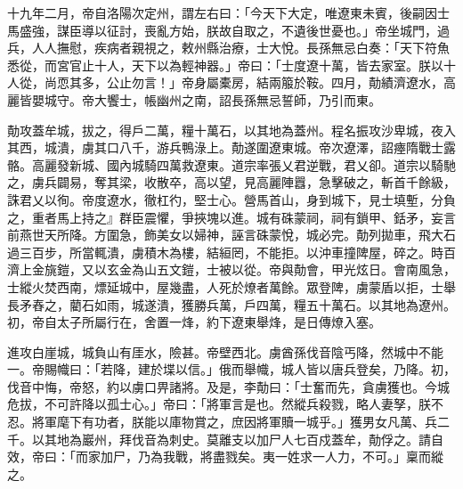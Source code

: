 \begin{pinyinscope}
 十九年二月，帝自洛陽次定州，謂左右曰：「今天下大定，唯遼東未賓，後嗣因士馬盛強，謀臣導以征討，喪亂方始，朕故自取之，不遺後世憂也。」帝坐城門，過兵，人人撫慰，疾病者親視之，敕州縣治療，士大悅。長孫無忌白奏：「天下符魚悉從，而宮官止十人，天下以為輕神器。」帝曰：「士度遼十萬，皆去家室。朕以十人從，尚恧其多，公止勿言！」帝身屬橐房，結兩箙於鞍。四月，勣績濟遼水，高麗皆嬰城守。帝大饗士，帳幽州之南，詔長孫無忌誓師，乃引而東。



 勣攻蓋牟城，拔之，得戶二萬，糧十萬石，以其地為蓋州。程名振攻沙卑城，夜入其西，城潰，虜其口八千，游兵鴨淥上。勣遂圍遼東城。帝次遼澤，詔瘞隋戰士露骼。高麗發新城、國內城騎四萬救遼東。道宗率張乂君逆戰，君乂卻。道宗以騎馳之，虜兵闢易，奪其梁，收散卒，高以望，見高麗陣囂，急擊破之，斬首千餘級，誅君乂以徇。帝度遼水，徹杠彴，堅士心。營馬首山，身到城下，見士填塹，分負之，重者馬上持之』群臣震懼，爭挾塊以進。城有硃蒙祠，祠有鎖甲、銛矛，妄言前燕世天所降。方圍急，飾美女以婦神，誣言硃蒙悅，城必完。勣列拋車，飛大石過三百步，所當輒潰，虜積木為樓，結絙罔，不能拒。以沖車撞陴屋，碎之。時百濟上金旐鎧，又以玄金為山五文鎧，士被以從。帝與勣會，甲光炫日。會南風急，士縱火焚西南，熛延城中，屋幾盡，人死於燎者萬餘。眾登陴，虜蒙盾以拒，士舉長矛舂之，藺石如雨，城遂潰，獲勝兵萬，戶四萬，糧五十萬石。以其地為遼州。初，帝自太子所屬行在，舍置一烽，約下遼東舉烽，是日傳燎入塞。



 進攻白崖城，城負山有厓水，險甚。帝壁西北。虜酋孫伐音陰丐降，然城中不能一。帝賜幟曰：「若降，建於堞以信。」俄而舉幟，城人皆以唐兵登矣，乃降。初，伐音中悔，帝怒，約以虜口畀諸將。及是，李勣曰：「士奮而先，貪虜獲也。今城危拔，不可許降以孤士心。」帝曰：「將軍言是也。然縱兵殺戮，略人妻孥，朕不忍。將軍麾下有功者，朕能以庫物賞之，庶因將軍贖一城乎。」獲男女凡萬、兵二千。以其地為巖州，拜伐音為刺史。莫離支以加尸人七百戍蓋牟，勣俘之。請自效，帝曰：「而家加尸，乃為我戰，將盡戮矣。夷一姓求一人力，不可。」稟而縱之。




\end{pinyinscope}
